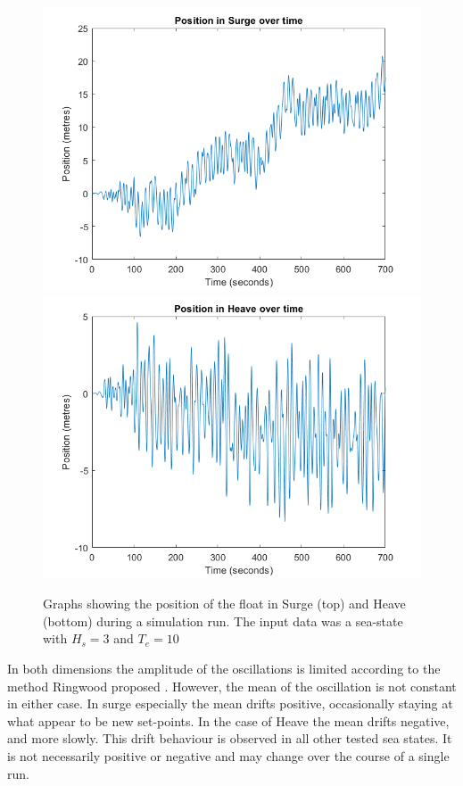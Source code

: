 \documentclass{report}
\begin{document}
\begin{figure}
\centering
\includegraphics[scale=0.5]{graphs/constraintBreakingSurge}
\includegraphics[scale=0.5]{graphs/constraintBreakingHeave}
\caption{Graphs showing the position of the float in Surge (top) and Heave (bottom) during a simulation run. The input data was a sea-state with $H_s = 3$ and $T_e = 10$}
\label{constraintBreaking}
\end{figure} 

In both dimensions the amplitude of the oscillations is limited according to the method Ringwood proposed \cite{ringwood}. However, the mean of the oscillation is not constant in either case. In surge especially the mean drifts positive, occasionally staying at what appear to be new set-points. In the case of Heave the mean drifts negative, and more slowly. This drift behaviour is observed in all other tested sea states. It is not necessarily positive or negative and may change over the course of a single run.
\end{document}
